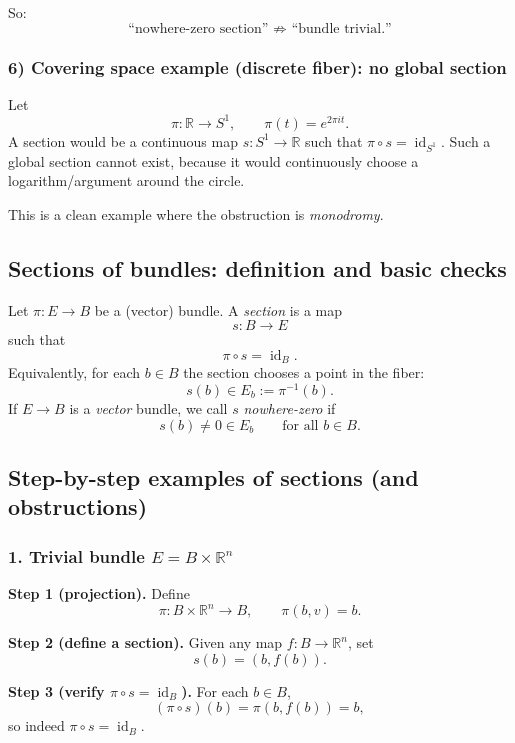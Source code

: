 \documentclass[12pt,a4paper]{article}
\DeclareMathOperator{\id}{id}
\theoremstyle{notespace}
\begin{document}
So:
\[
\text{``nowhere-zero section'' } \not\Rightarrow \text{ ``bundle trivial.''}
\]

\subsubsection*{6) Covering space example (discrete fiber): no global section}

Let
\[
\pi:\mathbb{R}\to S^1,\qquad \pi(t)=e^{2\pi i t}.
\]
A section would be a continuous map $s:S^1\to \mathbb{R}$ such that $\pi\circ s=\id_{S^1}$. Such a global section cannot exist, because it would continuously choose a logarithm/argument around the circle.

This is a clean example where the obstruction is \emph{monodromy}.


\subsection{Sections of bundles: definition and basic checks}

Let $\pi:E\to B$ be a (vector) bundle. A \emph{section} is a map
\[
s:B\to E
\]
such that
\[
\pi\circ s=\id_B.
\]
Equivalently, for each $b\in B$ the section chooses a point in the fiber:
\[
s(b)\in E_b:=\pi^{-1}(b).
\]
If $E\to B$ is a \emph{vector} bundle, we call $s$ \emph{nowhere-zero} if
\[
s(b)\neq 0\in E_b \qquad \text{for all } b\in B.
\]

\subsection{Step-by-step examples of sections (and obstructions)}

\subsubsection{1. Trivial bundle $E=B\times \mathbb{R}^n$}

\textbf{Step 1 (projection).} Define
\[
\pi:B\times \mathbb{R}^n\to B,\qquad \pi(b,v)=b.
\]

\textbf{Step 2 (define a section).} Given any map $f:B\to \mathbb{R}^n$, set
\[
s(b)=(b,f(b)).
\]

\textbf{Step 3 (verify $\pi\circ s=\id_B$).} For each $b\in B$,
\[
(\pi\circ s)(b)=\pi(b,f(b))=b,
\]
so indeed $\pi\circ s=\id_B$.
\end{document}
